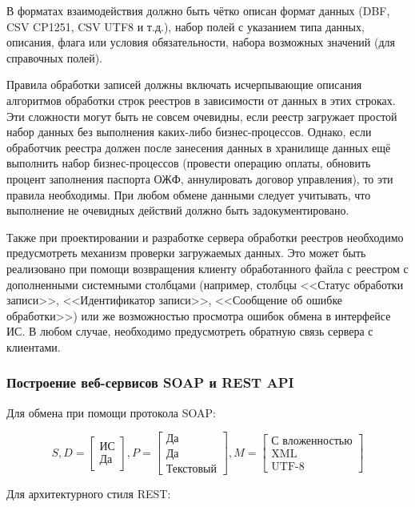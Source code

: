 В форматах взаимодействия должно быть чётко описан формат данных (DBF, CSV CP1251, CSV UTF8 и т.д.), набор полей с указанием типа данных, описания, флага или условия обязательности, набора возможных значений (для справочных полей).

Правила обработки записей должны включать исчерпывающие описания алгоритмов обработки строк реестров в зависимости от данных в этих строках.
Эти сложности могут быть не совсем очевидны, если реестр загружает простой набор данных без выполнения каких-либо бизнес-процессов.
Однако, если обработчик реестра должен после занесения данных в хранилище данных ещё выполнить набор бизнес-процессов (провести операцию оплаты, обновить процент заполнения паспорта ОЖФ, аннулировать договор управления), то эти правила необходимы.
При любом обмене данными следует учитывать, что выполнение не очевидных действий должно быть задокументировано.

Также при проектировании и разработке сервера обработки реестров необходимо предусмотреть механизм проверки загружаемых данных.
Это может быть реализовано при помощи возвращения клиенту обработанного файла с реестром с дополненными системными столбцами (например, столбцы <<Статус обработки записи>>, <<Идентификатор записи>>, <<Сообщение об ошибке обработки>>) или же возможностью просмотра ошибок обмена в интерфейсе ИС.
В любом случае, необходимо предусмотреть обратную связь сервера с клиентами.

\subsubsection{Построение веб-сервисов SOAP и REST API}

Для обмена при помощи протокола SOAP:

$$
S,D = \begin{bmatrix}
	\text{ИС} \\
	\text{Да}
\end{bmatrix},
P = \begin{bmatrix}
	\text{Да} \\
	\text{Да} \\
	\text{Текстовый}
\end{bmatrix},
M = \begin{bmatrix}
	\text{С вложенностью} \\
	\text{XML} \\
	\text{UTF-8}
\end{bmatrix}
$$

Для архитектурного стиля REST:

